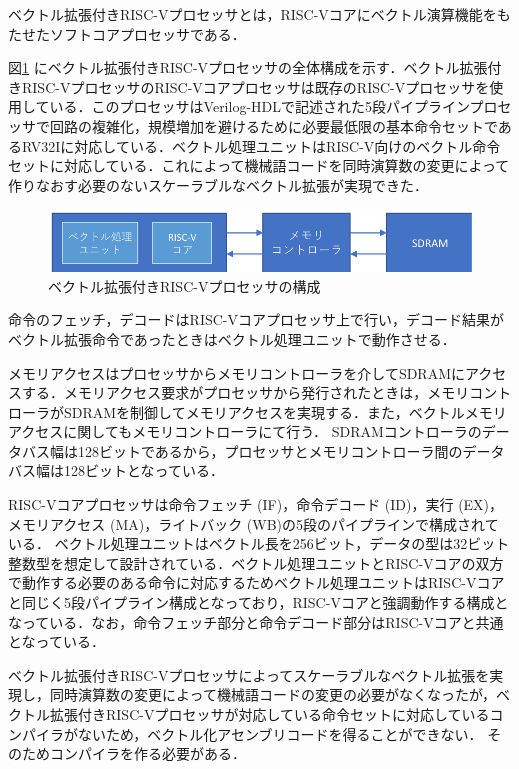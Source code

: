 ベクトル拡張付きRISC-Vプロセッサとは，RISC-Vコアにベクトル演算機能をもたせたソフトコアプロセッサである．

図\ref{fig:MIQS_system}
にベクトル拡張付きRISC-Vプロセッサの全体構成を示す．ベクトル拡張付きRISC-VプロセッサのRISC-Vコアプロセッサは既存のRISC-Vプロセッサを使用している．このプロセッサはVerilog-HDLで記述された5段パイプラインプロセッサで回路の複雑化，規模増加を避けるために必要最低限の基本命令セットであるRV32Iに対応している．ベクトル処理ユニットはRISC-V向けのベクトル命令セットに対応している．これによって機械語コードを同時演算数の変更によって作りなおす必要のないスケーラブルなベクトル拡張が実現できた．

\begin{figure}[b]
\begin{center}
    \includegraphics[scale=1.0]{image/MIQS_system.pdf}
    \caption{ベクトル拡張付きRISC-Vプロセッサの構成}
    \label{fig:MIQS_system}
\end{center}
\end{figure}

命令のフェッチ，デコードはRISC-Vコアプロセッサ上で行い，デコード結果がベクトル拡張命令であったときはベクトル処理ユニットで動作させる．

メモリアクセスはプロセッサからメモリコントローラを介してSDRAMにアクセスする．メモリアクセス要求がプロセッサから発行されたときは，メモリコントローラがSDRAMを制御してメモリアクセスを実現する．また，ベクトルメモリアクセスに関してもメモリコントローラにて行う．
SDRAMコントローラのデータバス幅は128ビットであるから，プロセッサとメモリコントローラ間のデータバス幅は128ビットとなっている．

RISC-Vコアプロセッサは命令フェッチ (IF)，命令デコード (ID)，実行 (EX)，メモリアクセス (MA)，ライトバック (WB)の5段のパイプラインで構成されている．
ベクトル処理ユニットはベクトル長を256ビット，データの型は32ビット整数型を想定して設計されている．ベクトル処理ユニットとRISC-Vコアの双方で動作する必要のある命令に対応するためベクトル処理ユニットはRISC-Vコアと同じく5段パイプライン構成となっており，RISC-Vコアと強調動作する構成となっている．なお，命令フェッチ部分と命令デコード部分はRISC-Vコアと共通となっている．

ベクトル拡張付きRISC-Vプロセッサによってスケーラブルなベクトル拡張を実現し，同時演算数の変更によって機械語コードの変更の必要がなくなったが，ベクトル拡張付きRISC-Vプロセッサが対応している命令セットに対応しているコンパイラがないため，ベクトル化アセンブリコードを得ることができない．
そのためコンパイラを作る必要がある．